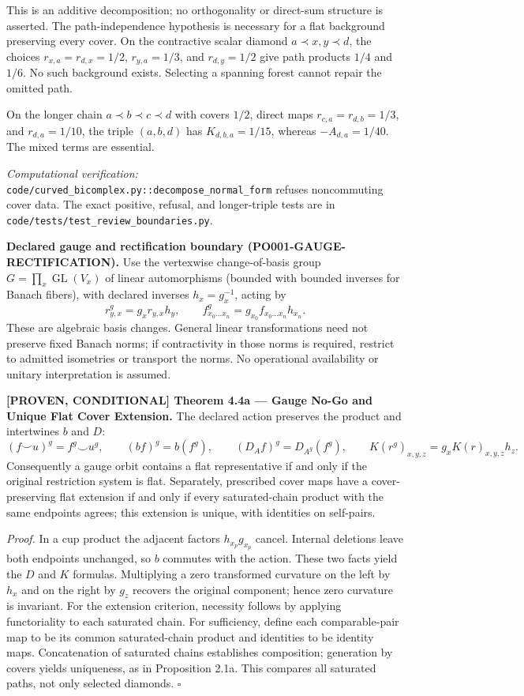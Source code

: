 \documentclass[
  english,
  10pt,
  a4paper,
]{article}
\renewenvironment{quote}
  {\begin{leftbar}\small}
  {\end{leftbar}}
\begin{document}
This is an additive decomposition; no orthogonality or direct-sum
structure is asserted. The path-independence hypothesis is necessary for
a flat background preserving every cover. On the contractive scalar
diamond \(a\prec x,y\prec d\), the choices \(r_{x,a}=r_{d,x}=1/2\),
\(r_{y,a}=1/3\), and \(r_{d,y}=1/2\) give path products \(1/4\) and
\(1/6\). No such background exists. Selecting a spanning forest cannot
repair the omitted path.

On the longer chain \(a\prec b\prec c\prec d\) with covers \(1/2\),
direct maps \(r_{c,a}=r_{d,b}=1/3\), and \(r_{d,a}=1/10\), the triple
\((a,b,d)\) has \(K_{d,b,a}=1/15\), whereas \(-A_{d,a}=1/40\). The mixed
terms are essential.

\emph{Computational verification:}
\nolinkurl{code/curved_bicomplex.py::decompose_normal_form} refuses
noncommuting cover data. The exact positive, refusal, and longer-triple
tests are in \nolinkurl{code/tests/test_review_boundaries.py}.

\textbf{Declared gauge and rectification boundary
(PO001-GAUGE-RECTIFICATION).} Use the vertexwise change-of-basis group
\(G=\prod_x\operatorname{GL}(V_x)\) of linear automorphisms (bounded
with bounded inverses for Banach fibers), with declared inverses
\(h_x=g_x^{-1}\), acting by \[
r^g_{y,x}=g_xr_{y,x}h_y,\qquad
f^g_{x_0\ldots x_n}=g_{x_0}f_{x_0\ldots x_n}h_{x_n}.
\] These are algebraic basis changes. General linear transformations
need not preserve fixed Banach norms; if contractivity in those norms is
required, restrict to admitted isometries or transport the norms. No
operational availability or unitary interpretation is assumed.

\begin{quote}
\textbf{{[}PROVEN, CONDITIONAL{]} Theorem 4.4a --- Gauge No-Go and
Unique Flat Cover Extension.} The declared action preserves the product
and intertwines \(b\) and \(D\): \[
(f\smile u)^g=f^g\smile u^g,\qquad
(bf)^g=b(f^g),\qquad
(D_Af)^g=D_{A^g}(f^g),\qquad
K(r^g)_{x,y,z}=g_xK(r)_{x,y,z}h_z.
\] Consequently a gauge orbit contains a flat representative if and only
if the original restriction system is flat. Separately, prescribed cover
maps have a cover-preserving flat extension if and only if every
saturated-chain product with the same endpoints agrees; this extension
is unique, with identities on self-pairs.

\emph{Proof.} In a cup product the adjacent factors \(h_{x_p}g_{x_p}\)
cancel. Internal deletions leave both endpoints unchanged, so \(b\)
commutes with the action. These two facts yield the \(D\) and \(K\)
formulas. Multiplying a zero transformed curvature on the left by
\(h_x\) and on the right by \(g_z\) recovers the original component;
hence zero curvature is invariant. For the extension criterion,
necessity follows by applying functoriality to each saturated chain. For
sufficiency, define each comparable-pair map to be its common
saturated-chain product and identities to be identity maps.
Concatenation of saturated chains establishes composition; generation by
covers yields uniqueness, as in Proposition 2.1a. This compares all
saturated paths, not only selected diamonds. \(\square\)
\end{quote}
\end{document}

